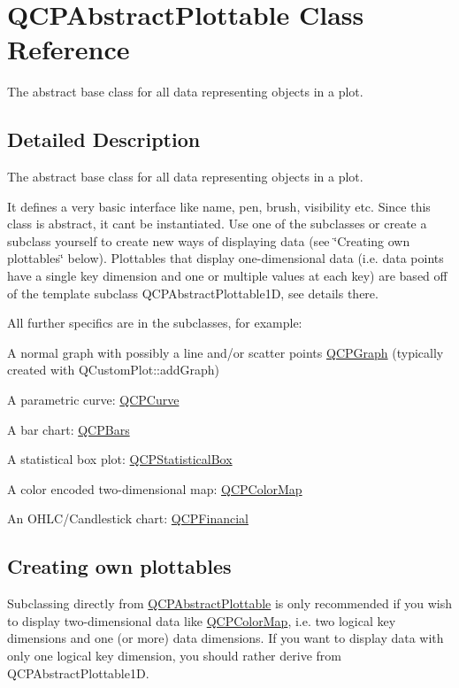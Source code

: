 \hypertarget{class_q_c_p_abstract_plottable}{}\section{Q\+C\+P\+Abstract\+Plottable Class Reference}
\label{class_q_c_p_abstract_plottable}


The abstract base class for all data representing objects in a plot.  




\subsection{Detailed Description}
The abstract base class for all data representing objects in a plot. 

It defines a very basic interface like name, pen, brush, visibility etc. Since this class is abstract, it can\textquotesingle{}t be instantiated. Use one of the subclasses or create a subclass yourself to create new ways of displaying data (see \char`\"{}\+Creating own plottables\char`\"{} below). Plottables that display one-\/dimensional data (i.\+e. data points have a single key dimension and one or multiple values at each key) are based off of the template subclass Q\+C\+P\+Abstract\+Plottable1D, see details there.

All further specifics are in the subclasses, for example\+: \begin{DoxyItemize}
\item A normal graph with possibly a line and/or scatter points \mbox{\hyperlink{class_q_c_p_graph}{Q\+C\+P\+Graph}} (typically created with Q\+Custom\+Plot\+::add\+Graph) \item A parametric curve\+: \mbox{\hyperlink{class_q_c_p_curve}{Q\+C\+P\+Curve}} \item A bar chart\+: \mbox{\hyperlink{class_q_c_p_bars}{Q\+C\+P\+Bars}} \item A statistical box plot\+: \mbox{\hyperlink{class_q_c_p_statistical_box}{Q\+C\+P\+Statistical\+Box}} \item A color encoded two-\/dimensional map\+: \mbox{\hyperlink{class_q_c_p_color_map}{Q\+C\+P\+Color\+Map}} \item An O\+H\+L\+C/\+Candlestick chart\+: \mbox{\hyperlink{class_q_c_p_financial}{Q\+C\+P\+Financial}}\end{DoxyItemize}
\hypertarget{class_q_c_p_abstract_plottable_plottables-subclassing}{}\subsection{Creating own plottables}\label{class_q_c_p_abstract_plottable_plottables-subclassing}
Subclassing directly from \mbox{\hyperlink{class_q_c_p_abstract_plottable}{Q\+C\+P\+Abstract\+Plottable}} is only recommended if you wish to display two-\/dimensional data like \mbox{\hyperlink{class_q_c_p_color_map}{Q\+C\+P\+Color\+Map}}, i.\+e. two logical key dimensions and one (or more) data dimensions. If you want to display data with only one logical key dimension, you should rather derive from Q\+C\+P\+Abstract\+Plottable1D.


